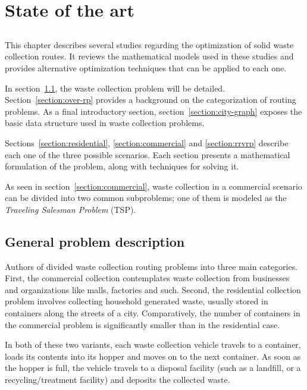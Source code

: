 \chapter{State of the art}
\label{chap:sota}

\section*{}

This chapter describes several studies regarding the optimization of solid
waste collection routes. It reviews the mathematical models used in these
studies and provides alternative optimization techniques that can be applied to
each one.

In section~\ref{section:problem}, the waste collection problem will be
detailed. Section~\ref{section:over-rp} provides a background on the
categorization of routing problems. As a final introductory section,
section~\ref{section:city-graph} exposes the basic data structure used in waste
collection problems.

Sections~\ref{section:residential}, \ref{section:commercial} and
\ref{section:rrvrp} describe each one of the three possible scenarios. Each
section presents a mathematical formulation of the problem, along with
techniques for solving it.

As seen in section~\ref{section:commercial}, waste collection in a commercial
scenario can be divided into two common subproblems; one of them is modeled as
the \textit{Traveling Salesman Problem} (TSP).


\section{General problem description}
\label{section:problem}

Authors of \citet{Golden01} divided waste collection routing problems into
three main categories. First, the commercial collection contemplates waste
collection from businesses and organizations like malls, factories and such.
Second, the residential collection problem involves collecting household
generated waste, usually stored in containers along the streets of a city.
Comparatively, the number of containers in the commercial problem is
significantly smaller than in the residential case.

In both of these two variants, each waste collection vehicle travels to a
container, loads its contents into its hopper and moves on to the next
container. As soon as the hopper is full, the vehicle travels to a disposal
facility (such as a landfill, or a recycling/treatment facility) and deposits
the collected waste.

